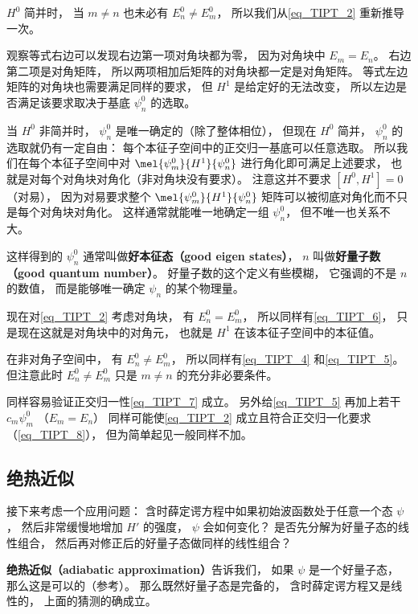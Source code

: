$H^0$ 简并时， 当 $m\ne n$ 也未必有 $E_n^0 \ne E_m^0$， 所以我们从\autoref{eq_TIPT_2} 重新推导一次。

观察等式右边可以发现右边第一项对角块都为零， 因为对角块中 $E_m = E_n$。 右边第二项是对角矩阵， 所以两项相加后矩阵的对角块都一定是对角矩阵。 等式左边矩阵的对角块也需要满足同样的要求， 但 $H^1$ 是给定好的无法改变， 所以左边是否满足该要求取决于基底 $\psi_n^0$ 的选取。

当 $H^0$ 非简并时， $\psi_n^0$ 是唯一确定的（除了整体相位）， 但现在 $H^0$ 简并， $\psi_n^0$ 的选取就仍有一定自由： 每个本征子空间中的正交归一基底可以任意选取。 所以我们在每个本征子空间中对 $\mel{\psi_m^0}{H^1}{\psi_n^0}$ 进行角化即可满足上述要求， 也就是对每个对角块对角化（非对角块没有要求）。 注意这并不要求 $[H^0, H^1] = 0$ （对易）， 因为对易要求整个 $\mel{\psi_m^0}{H^1}{\psi_n^0}$ 矩阵可以被彻底对角化而不只是每个对角块对角化。 这样通常就能唯一地确定一组 $\psi_n^0$， 但不唯一也关系不大。

这样得到的 $\psi_n^0$ 通常叫做\textbf{好本征态（good eigen states）}， $n$ 叫做\textbf{好量子数（good quantum number）}。 好量子数的这个定义有些模糊， 它强调的不是 $n$ 的数值， 而是能够唯一确定 $\psi_n$ 的某个物理量。

现在对\autoref{eq_TIPT_2} 考虑对角块， 有 $E_n^0 = E_m^0$， 所以同样有\autoref{eq_TIPT_6}， 只是现在这就是对角块中的对角元， 也就是 $H^1$ 在该本征子空间中的本征值。

在非对角子空间中， 有 $E_n^0 \ne E_m^0$， 所以同样有\autoref{eq_TIPT_4} 和\autoref{eq_TIPT_5}。 但注意此时 $E_n^0 \ne E_m^0$ 只是 $m \ne n$ 的充分非必要条件。

同样容易验证正交归一性\autoref{eq_TIPT_7} 成立。 另外给\autoref{eq_TIPT_5} 再加上若干 $c_m \psi_m^0$ （$E_m = E_n$） 同样可能使\autoref{eq_TIPT_2} 成立且符合正交归一化要求（\autoref{eq_TIPT_8}）， 但为简单起见一般同样不加。

\subsection{绝热近似}
接下来考虑一个应用问题： 含时薛定谔方程中如果初始波函数处于任意一个态 $\psi$， 然后非常缓慢地增加 $H'$ 的强度， $\psi$ 会如何变化？ 是否先分解为好量子态的线性组合， 然后再对修正后的好量子态做同样的线性组合？

\textbf{绝热近似（adiabatic approximation）}告诉我们， 如果 $\psi$ 是一个好量子态， 那么这是可以的（参考\cite{GriffQ}）。 那么既然好量子态是完备的， 含时薛定谔方程又是线性的， 上面的猜测的确成立。

